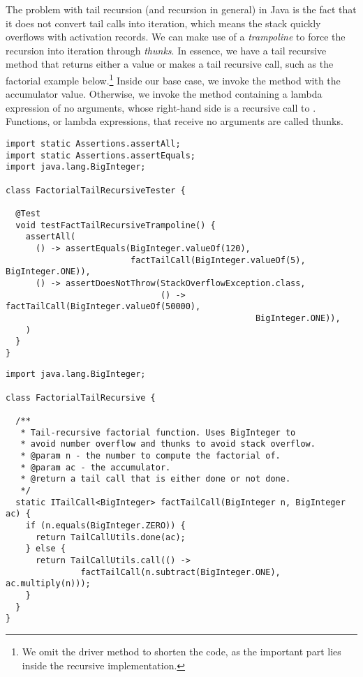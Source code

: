 The problem with tail recursion (and recursion in general) in Java is the fact that it does not convert tail calls into iteration, which means the stack quickly overflows with activation records. We can make use of a \emph{trampoline} to force the recursion into iteration through \emph{thunks}. In essence, we have a tail recursive method that returns either a value or makes a tail recursive call, such as the factorial example below.\footnote{We omit the driver method to shorten the code, as the important part lies inside the recursive implementation.} Inside our base case, we invoke the  method with the accumulator value. Otherwise, we invoke the  method containing a lambda expression of no arguments, whose right-hand side is a recursive call to . Functions, or lambda expressions, that receive no arguments are called thunks.

\enlargethispage{2\baselineskip}
\begin{lstlisting}[language=MyJava]
import static Assertions.assertAll;
import static Assertions.assertEquals;
import java.lang.BigInteger;

class FactorialTailRecursiveTester {
  
  @Test 
  void testFactTailRecursiveTrampoline() {
    assertAll(
      () -> assertEquals(BigInteger.valueOf(120), 
                         factTailCall(BigInteger.valueOf(5), BigInteger.ONE)),
      () -> assertDoesNotThrow(StackOverflowException.class,
                               () -> factTailCall(BigInteger.valueOf(50000), 
                                                  BigInteger.ONE)),
    )
  }
}
\end{lstlisting}

\begin{lstlisting}[language=MyJava]
import java.lang.BigInteger;

class FactorialTailRecursive {
 
  /**
   * Tail-recursive factorial function. Uses BigInteger to 
   * avoid number overflow and thunks to avoid stack overflow.
   * @param n - the number to compute the factorial of.
   * @param ac - the accumulator.
   * @return a tail call that is either done or not done.
   */
  static ITailCall<BigInteger> factTailCall(BigInteger n, BigInteger ac) {
    if (n.equals(BigInteger.ZERO)) {
      return TailCallUtils.done(ac);
    } else {
      return TailCallUtils.call(() -> 
               factTailCall(n.subtract(BigInteger.ONE), ac.multiply(n)));
    }
  }
}
\end{lstlisting}

